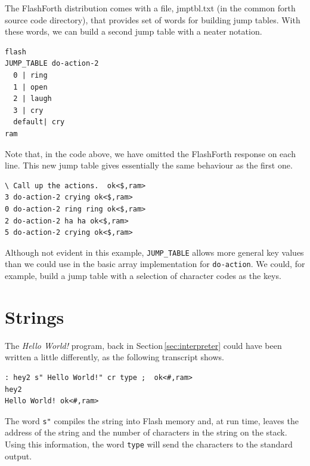 \documentclass[12pt,a4paper]{article}
\begin{document}
\medskip
The FlashForth distribution comes with a file, jmptbl.txt (in the common forth source code directory),
that provides set of words for building jump tables.
With these words, we can build a second jump table with a neater notation.
\begin{verbatim}
flash
JUMP_TABLE do-action-2
  0 | ring
  1 | open
  2 | laugh 
  3 | cry
  default| cry
ram
\end{verbatim}
Note that, in the code above, we have omitted the FlashForth response on each line.
This new jump table gives essentially the same behaviour as the first one.
\begin{verbatim}
\ Call up the actions.  ok<$,ram>
3 do-action-2 crying ok<$,ram>
0 do-action-2 ring ring ok<$,ram>
2 do-action-2 ha ha ok<$,ram>
5 do-action-2 crying ok<$,ram>
\end{verbatim}
Although not evident in this example, \verb!JUMP_TABLE! allows more general key values
than we could use in the basic array implementation for \verb!do-action!.
We could, for example, build a jump table with a selection of character codes as the keys.

\newpage
\section{Strings}
%
The \textit{Hello World!} program, back in Section\,\ref{sec:interpreter}
could have been written a little differently, as the following transcript shows.
\begin{verbatim}
: hey2 s" Hello World!" cr type ;  ok<#,ram>
hey2 
Hello World! ok<#,ram>
\end{verbatim}
The word \verb!s"! compiles the string into Flash memory and, at run time,
leaves the address of the string and the number of characters in the string
on the stack.
Using this information, the word \verb!type! will send the characters to the standard output. 

\medskip
\end{document}
